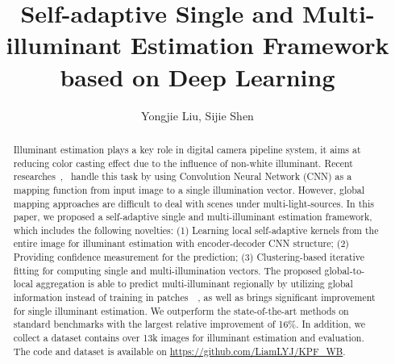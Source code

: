 \documentclass[10pt,twocolumn,letterpaper]{article}
\begin{document}
\title{Self-adaptive Single and Multi-illuminant Estimation Framework \\
based on Deep Learning}

\author{Yongjie Liu, Sijie Shen
}


\maketitle

\begin{abstract}
  Illuminant estimation plays a key role in digital camera pipeline system,
  it aims at reducing color casting effect due to the influence of non-white illuminant.
  Recent researches~\cite{shi2016deep},~\cite{hu2017fc} handle this task by
  using Convolution Neural Network (CNN) as a mapping function from input image to a single illumination vector.
  However, global mapping approaches are difficult to deal with scenes under multi-light-sources.
  In this paper, we proposed a self-adaptive single and multi-illuminant estimation framework,
  which includes the following novelties:
  (1) Learning local self-adaptive kernels from the entire image for illuminant estimation with encoder-decoder CNN structure;
  (2) Providing confidence measurement for the prediction;
  (3) Clustering-based iterative fitting for computing single and multi-illumination vectors.
  The proposed global-to-local aggregation is able to predict multi-illuminant regionally by utilizing
  global information instead of training in patches~\cite{bianco2015single}~\cite{gijsenij2012color},
  as well as brings significant improvement for single illuminant estimation.
  We outperform the state-of-the-art methods on standard benchmarks with the largest relative improvement of 16\%.
  In addition, we collect a dataset contains over 13k images for illuminant estimation and evaluation.
  The code and dataset is available on \url{https://github.com/LiamLYJ/KPF_WB}. 
\end{abstract}
\end{document}
